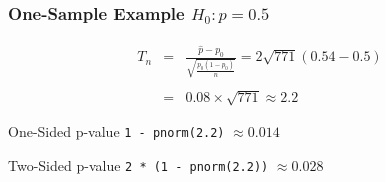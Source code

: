 \begin{frame}
	\frametitle{One-Sample Example $H_0\colon p = 0.5$}



	\begin{eqnarray*}
		T_n &=& \frac{\widehat{p} - p_0}{\sqrt{\displaystyle \frac{p_0(1 - p_0)}{n}}} = 2 \sqrt{771}(0.54 - 0.5)\\ \\
		&=& 0.08 \times \sqrt{771} \approx 2.2
	\end{eqnarray*}

  \vspace{-1em}

	\begin{block}
		{One-Sided p-value}
		\texttt{1 - pnorm(2.2)} $\approx 0.014$
	\end{block}
	\begin{block}
		{Two-Sided p-value}
		\texttt{2 * (1 - pnorm(2.2))} $\approx 0.028$
	\end{block}
\end{frame}
